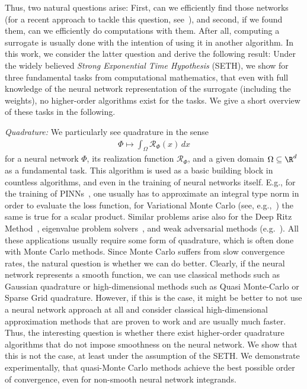 \documentclass{amsart}[11pt]
\numberwithin{equation}{section}
\newcommand{\realization}{\mathcal{R}}
\numberwithin{theorem}{section}
\begin{document}
 
Thus, two natural questions arise: First, can we efficiently find those networks (for a recent approach to tackle this question, see~\cite{optimalnn}), and second, if we found them, can we efficiently do computations with them. After all, computing a surrogate is usually done with the intention of using it in another algorithm. In this work, we consider the latter question and derive the following result: Under the widely believed \emph{Strong Exponential Time Hypothesis} (SETH), we show for three fundamental tasks from computational mathematics, that even with full knowledge of the neural network representation  of the surrogate (including the weights), no higher-order algorithms exist for the tasks.  
We give a short overview of these tasks in the following.

\emph{Quadrature: } We particularly see quadrature in the sense
\begin{align*}
\Phi \mapsto \int_{\Omega} \realization_\Phi(x) \, dx 
\end{align*} 
for a neural network $\Phi$, its realization function $\realization_\Phi$, and a given domain $\Omega \subseteq \R^d$ as a fundamental task. 
This algorithm is used as a basic building block in countless algorithms, and even in the training of neural networks itself. E.g., for the training of PINNs~\cite{deepRitz_E2018}, one usually has to approximate an integral type norm in order to evaluate the loss function, for Variational Monte Carlo (see, e.g.,~\cite{vmc,Gerard2022GoldstandardST}) the same is true for a scalar product. 
Similar problems arise also for the  Deep Ritz Method~\cite{deepRitz_E2018}, 
eigenvalue problem solvers~\cite{HAN2020109792},  
and weak adversarial methods (e.g.~\cite{ZANG2020109409}).
All these applications usually require some form of quadrature, which is often done with Monte Carlo methods. Since Monte Carlo suffers from slow convergence rates, the natural question is whether we can do better. Clearly, if the neural network represents a smooth function, we can use classical methods such as Gaussian quadrature or high-dimensional methods such as Quasi Monte-Carlo or Sparse Grid quadrature. However, if this is the case, it might be better to not use a neural network approach at all and consider classical high-dimensional approximation methods that are proven to work and are usually much faster.
Thus, the interesting question is whether there exist higher-order quadrature algorithms that do not impose smoothness on the neural network. We show that this is not the case, at least under the assumption of the SETH. We demonstrate experimentally, that quasi-Monte Carlo methods achieve the best possible order of convergence, even for non-smooth neural network integrands.
 
\end{document}
